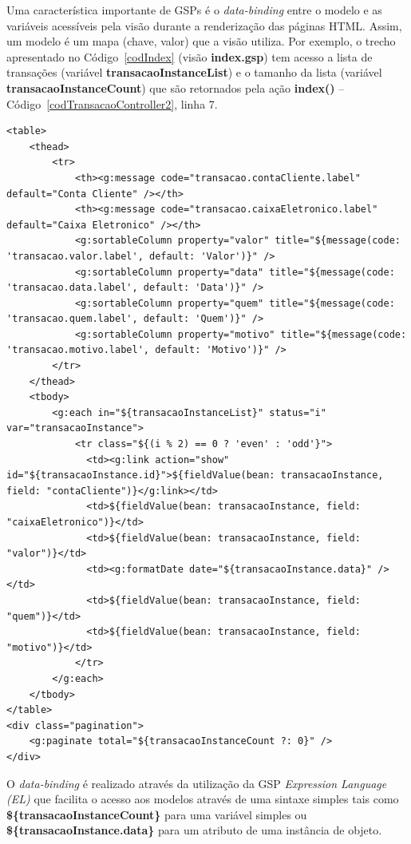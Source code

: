 Uma característica importante de GSPs é o {\it data-binding} entre o modelo e as
variáveis acessíveis pela visão durante a renderização das páginas HTML.  Assim,
um modelo é  um mapa (chave, valor)  que a visão utiliza. Por  exemplo, o trecho
apresentado no Código~\ref{codIndex} (visão  {\bf index.gsp}) tem acesso a lista
de  transações  (variável {\bf  transacaoInstanceList})  e  o  tamanho da  lista
(variável  {\bf  transacaoInstanceCount})  que  são retornados  pela  ação  {\bf
  index()} -- Código~\ref{codTransacaoController2}, linha 7.

\begin{lstlisting}[caption=Visão    {\bf    transacao/index.gsp},    frame=trBL,
    float=htbp, label=codIndex] 
<table>
	<thead>
		<tr>
			<th><g:message code="transacao.contaCliente.label" default="Conta Cliente" /></th>
			<th><g:message code="transacao.caixaEletronico.label" default="Caixa Eletronico" /></th>
			<g:sortableColumn property="valor" title="${message(code: 'transacao.valor.label', default: 'Valor')}" />
			<g:sortableColumn property="data" title="${message(code: 'transacao.data.label', default: 'Data')}" />
			<g:sortableColumn property="quem" title="${message(code: 'transacao.quem.label', default: 'Quem')}" />
			<g:sortableColumn property="motivo" title="${message(code: 'transacao.motivo.label', default: 'Motivo')}" />
		</tr>
	</thead>
	<tbody>
		<g:each in="${transacaoInstanceList}" status="i" var="transacaoInstance">
			<tr class="${(i % 2) == 0 ? 'even' : 'odd'}">
			  <td><g:link action="show" id="${transacaoInstance.id}">${fieldValue(bean: transacaoInstance, field: "contaCliente")}</g:link></td>
			  <td>${fieldValue(bean: transacaoInstance, field: "caixaEletronico")}</td>
			  <td>${fieldValue(bean: transacaoInstance, field: "valor")}</td>
			  <td><g:formatDate date="${transacaoInstance.data}" /></td>
			  <td>${fieldValue(bean: transacaoInstance, field: "quem")}</td>
			  <td>${fieldValue(bean: transacaoInstance, field: "motivo")}</td>
			</tr>
		</g:each>
	</tbody>
</table>
<div class="pagination">
	<g:paginate total="${transacaoInstanceCount ?: 0}" />
</div> 
\end{lstlisting}

\noindent O  {\it data-binding}  é realizado através  da utilização da  GSP {\it
  Expression Language  (EL)} que  facilita o acesso  aos modelos através  de uma
sintaxe simples  tais como {\bf \$\{transacaoInstanceCount\}}  para uma variável
simples ou {\bf \$\{transacaoInstance.data\}}  para um atributo de uma instância
de objeto.

